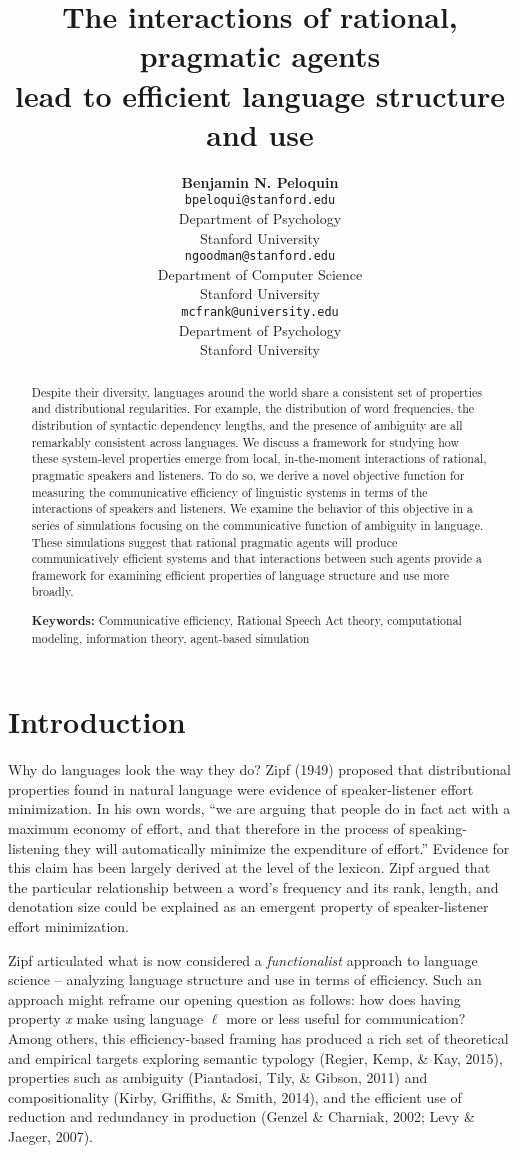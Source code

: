 \documentclass[10pt, letterpaper]{article}
\title{The interactions of rational, pragmatic agents\\
lead to efficient language structure and use}
\author{{\large \bf Benjamin N. Peloquin} \\ \texttt{bpeloqui@stanford.edu} \\ Department of Psychology \\ Stanford University \And {\large \bf Noah D. Goodman} \\ \texttt{ngoodman@stanford.edu} \\ Department of Computer Science \\ Stanford University \And {\large \bf Michael C. Frank} \\ \texttt{mcfrank@university.edu} \\ Department of Psychology \\ Stanford University}
\begin{document}
\maketitle

\begin{abstract}
Despite their diversity, languages around the world share a consistent
set of properties and distributional regularities. For example, the
distribution of word frequencies, the distribution of syntactic
dependency lengths, and the presence of ambiguity are all remarkably
consistent across languages. We discuss a framework for studying how
these system-level properties emerge from local, in-the-moment
interactions of rational, pragmatic speakers and listeners. To do so, we
derive a novel objective function for measuring the communicative
efficiency of linguistic systems in terms of the interactions of
speakers and listeners. We examine the behavior of this objective in a
series of simulations focusing on the communicative function of
ambiguity in language. These simulations suggest that rational pragmatic
agents will produce communicatively efficient systems and that
interactions between such agents provide a framework for examining
efficient properties of language structure and use more broadly.

\textbf{Keywords:}
Communicative efficiency, Rational Speech Act theory, computational
modeling, information theory, agent-based simulation
\end{abstract}

\section{Introduction}\label{introduction}

Why do languages look the way they do? Zipf (1949) proposed that
distributional properties found in natural language were evidence of
speaker-listener effort minimization. In his own words, ``we are arguing
that people do in fact act with a maximum economy of effort, and that
therefore in the process of speaking-listening they will automatically
minimize the expenditure of effort.'' Evidence for this claim has been
largely derived at the level of the lexicon. Zipf argued that the
particular relationship between a word's frequency and its rank, length,
and denotation size could be explained as an emergent property of
speaker-listener effort minimization. \par

Zipf articulated what is now considered a \emph{functionalist} approach
to language science -- analyzing language structure and use in terms of
efficiency. Such an approach might reframe our opening question as
follows: how does having property \textit{x} make using language
\(\ell\) more or less useful for communication? Among others, this
efficiency-based framing has produced a rich set of theoretical and
empirical targets exploring semantic typology (Regier, Kemp, \& Kay,
2015), properties such as ambiguity (Piantadosi, Tily, \& Gibson, 2011)
and compositionality (Kirby, Griffiths, \& Smith, 2014), and the
efficient use of reduction and redundancy in production (Genzel \&
Charniak, 2002; Levy \& Jaeger, 2007).\par
\end{document}
